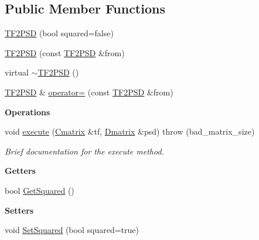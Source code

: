 \subsection*{Public Member Functions}
\begin{DoxyCompactItemize}
\item 
\hyperlink{classtsa_1_1_t_f2_p_s_d_a0557e0572905d9c92cec5c42851f00f9}{T\+F2\+P\+SD} (bool squared=false)
\item 
\hyperlink{classtsa_1_1_t_f2_p_s_d_a180ccd6544ef862a0b63a962e4c3e9b6}{T\+F2\+P\+SD} (const \hyperlink{classtsa_1_1_t_f2_p_s_d}{T\+F2\+P\+SD} \&from)
\item 
virtual \hyperlink{classtsa_1_1_t_f2_p_s_d_a99c083327989d11f095fb2194f02c852}{$\sim$\+T\+F2\+P\+SD} ()
\item 
\hyperlink{classtsa_1_1_t_f2_p_s_d}{T\+F2\+P\+SD} \& \hyperlink{classtsa_1_1_t_f2_p_s_d_a27a169e96e34605ccd463ca3f66e2cd1}{operator=} (const \hyperlink{classtsa_1_1_t_f2_p_s_d}{T\+F2\+P\+SD} \&from)
\end{DoxyCompactItemize}
\begin{Indent}\textbf{ Operations}\par
\begin{DoxyCompactItemize}
\item 
void \hyperlink{classtsa_1_1_t_f2_p_s_d_a9dbd9ccbc11e2b02dd7e187cfbcab8fa}{execute} (\hyperlink{namespacetsa_a86348fef1603a135fe5fba9e5f5486ee}{Cmatrix} \&tf, \hyperlink{namespacetsa_ad260cd21c1891c4ed391fe788569aba4}{Dmatrix} \&psd)  throw (bad\+\_\+matrix\+\_\+size)
\begin{DoxyCompactList}\small\item\em Brief documentation for the execute method. \end{DoxyCompactList}\end{DoxyCompactItemize}
\end{Indent}
\begin{Indent}\textbf{ Getters}\par
\begin{DoxyCompactItemize}
\item 
bool \hyperlink{classtsa_1_1_t_f2_p_s_d_a1299b56268f7c194f605e497b0d3faae}{Get\+Squared} ()
\end{DoxyCompactItemize}
\end{Indent}
\begin{Indent}\textbf{ Setters}\par
\begin{DoxyCompactItemize}
\item 
void \hyperlink{classtsa_1_1_t_f2_p_s_d_ac290dcfd9dc0a822c0df47eceee73692}{Set\+Squared} (bool squared=true)
\end{DoxyCompactItemize}
\end{Indent}
